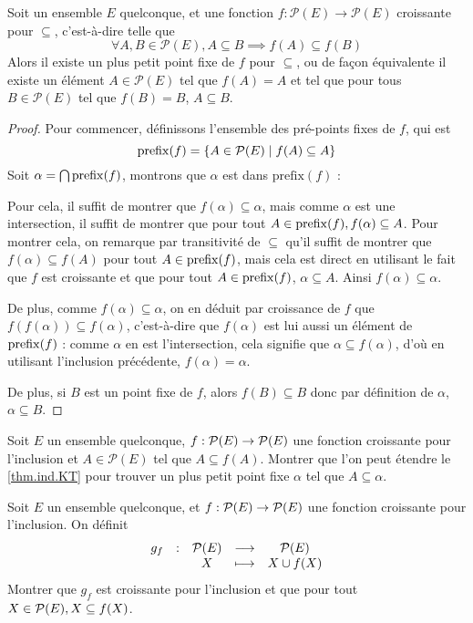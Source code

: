 \begin{theorem}\label{thm.ind.KT}
  Soit un ensemble $E$ quelconque, et une fonction
  $f : \mathcal P(E) \to \mathcal P(E)$ croissante pour $\subseteq$,
  c'est-à-dire telle que
  \[\forall A,B\in\mathcal P(E), A\subseteq B \implies f(A)\subseteq f(B)\]
  Alors il existe un plus petit point fixe de $f$ pour $\subseteq$, ou de façon
  équivalente il existe un élément $A\in \mathcal P(E)$ tel que $f(A)=A$ et tel
  que pour tous $B\in\mathcal P(E)$ tel que $f(B)=B$, $A\subseteq B$.
\end{theorem}
\begin{proof}
  Pour commencer, définissons l'ensemble des pré-points fixes de $f$, qui est
  \[\operatorname{prefix}(f) = \{ A \in \mathcal P(E)\mid f(A)\subseteq A\}\]
  Soit $\alpha = \bigcap \operatorname{prefix}(f)$, montrons que $\alpha$ est dans
  $\mathrm{prefix}(f)$ :

  Pour cela, il suffit de montrer que $f(\alpha)\subseteq \alpha$, mais comme
  $\alpha$ est une intersection, il suffit de montrer que pour tout
  $A\in\operatorname{prefix}(f), f(\alpha)\subseteq A$. Pour montrer cela, on
  remarque par transitivité de $\subseteq$ qu'il suffit de montrer que
  $f(\alpha)\subseteq f(A)$ pour tout $A\in \operatorname{prefix}(f)$, mais cela est
  direct en utilisant le fait que $f$ est croissante et que pour tout
  $A\in \operatorname{prefix}(f)$, $\alpha \subseteq A$. Ainsi
  $f(\alpha)\subseteq \alpha$.

  De plus, comme $f(\alpha)\subseteq \alpha$, on en déduit par croissance de
  $f$ que $f(f(\alpha))\subseteq f(\alpha)$, c'est-à-dire que $f(\alpha)$ est
  lui aussi un élément de $\operatorname{prefix}(f)$ : comme $\alpha$ en est l'intersection,
  cela signifie que $\alpha \subseteq f(\alpha)$, d'où en
  utilisant l'inclusion précédente, $f(\alpha) = \alpha$.

  De plus, si $B$ est un point fixe de $f$, alors $f(B)\subseteq B$ donc par
  définition de $\alpha$, $\alpha \subseteq B$.
\end{proof}

\begin{exercise}
  Soit $E$ un ensemble quelconque, $f : \mathcal{P}(E) \to \mathcal{P}(E)$ une
  fonction croissante pour l'inclusion et $A \in \mathcal P(E)$ tel que
  $A\subseteq f(A)$. Montrer que l'on peut étendre le \cref{thm.ind.KT} pour
  trouver un plus petit point fixe $\alpha$ tel que $A\subseteq \alpha$.
\end{exercise}

\begin{exercise}
  Soit $E$ un ensemble quelconque, et $f : \mathcal{P}(E) \to \mathcal{P}(E)$ une
  fonction croissante pour l'inclusion. On définit
  \[\begin{array}{ccccc}
    g_f & : & \mathcal{P}(E) & \longrightarrow & \mathcal{P}(E)\\
    & & X & \longmapsto & X \cup f(X)
  \end{array}\]
  Montrer que $g_f$ est croissante pour l'inclusion et que pour tout
  $X\in\mathcal{P}(E), X\subseteq f(X)$.
\end{exercise}

